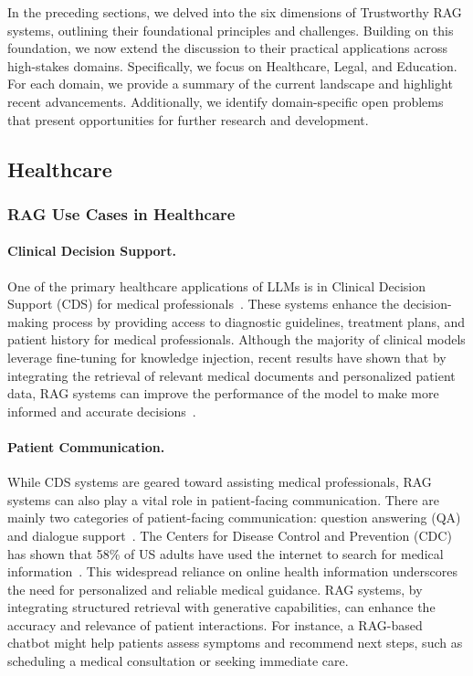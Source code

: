 In the preceding sections, we delved into the six dimensions of Trustworthy RAG systems, outlining their foundational principles and challenges. Building on this foundation, we now extend the discussion to their practical applications across high-stakes domains. Specifically, we focus on Healthcare, Legal, and Education. For each domain, we provide a summary of the current landscape and highlight recent advancements. Additionally, we identify domain-specific open problems that present opportunities for further research and development.

\subsection{Healthcare}
\subsubsection{RAG Use Cases in Healthcare}

\paragraph{Clinical Decision Support.}
One of the primary healthcare applications of LLMs is in Clinical Decision Support (CDS) for medical professionals~\cite{LEVRA2025113}. These systems enhance the decision-making process by providing access to diagnostic guidelines, treatment plans, and patient history for medical professionals. Although the majority of clinical models leverage fine-tuning for knowledge injection, recent results have shown that by integrating the retrieval of relevant medical documents and personalized patient data, RAG systems can improve the performance of the model to make more informed and accurate decisions~\cite{xiong2024benchmarkingretrievalaugmentedgenerationmedicine}. 

\paragraph{Patient Communication.}
While CDS systems are geared toward assisting medical professionals, RAG systems can also play a vital role in patient-facing communication. There are mainly two categories of patient-facing communication: question answering (QA) and dialogue support~\cite{HE2025102963}. The Centers for Disease Control and Prevention (CDC) has shown that 58\% of US adults have used the internet to search for medical information~\cite{cdc2023internet}. This widespread reliance on online health information underscores the need for personalized and reliable medical guidance. RAG systems, by integrating structured retrieval with generative capabilities, can enhance the accuracy and relevance of patient interactions. For instance, a RAG-based chatbot might help patients assess symptoms and recommend next steps, such as scheduling a medical consultation or seeking immediate care. 

